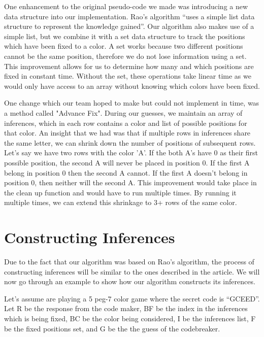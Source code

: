 \documentclass[11pt]{article}
\begin{document}
    One enhancement to the original pseudo-code we made was introducing a new data structure into our implementation. Rao's algorithm \enquote{uses a simple list data structure to represent the knowledge gained}\autocite{rao}. Our algorithm also makes use of a simple list, but we combine it with a set data structure to track the positions which have been fixed to a color. A set works because two different positions cannot be the same position, therefore we do not lose information using a set. This improvement allows for us to determine how many and which positions are fixed in constant time. Without the set, these operations take linear time as we would only have access to an array without knowing which colors have been fixed. 
    
    One change which our team hoped to make but could not implement in time, was a method called "Advance Fix". During our guesses, we maintain an array of inferences, which in each row contains a color and list of possible positions for that color. An insight that we had was that if multiple rows in inferences share the same letter, we can shrink down the number of positions of subsequent rows. Let's say we have two rows with the color 'A'. If the both A's have 0 as their first possible position, the second A will never be placed in position 0. If the first A belong in position 0 then the second A cannot. If the first A doesn't belong in position 0, then neither will the second A. This improvement would take place in the clean up function and would have to run multiple times. By running it multiple times, we can extend this shrinkage to 3+ rows of the same color.

    \section{Constructing Inferences}
    Due to the fact that our algorithm was based on Rao's algorithm, the process of constructing inferences will be similar to the ones described in the article\autocite{rao}. We will now go through an example to show how our algorithm constructs its inferences.

    Let's assume are playing a 5 peg-7 color game where the secret code is \enquote{GCEED}. Let R be the response from the code maker, BF be the index in the inferences which is being fixed, BC be the color being considered, I be the inferences list, F be the fixed positions set, and G be the the guess of the codebreaker.\\
\end{document}
